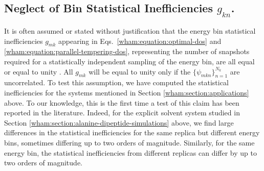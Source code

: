 \subsection{Neglect of Bin Statistical Inefficiencies $g_{kn}$.}
\label{wham:section:neglect-of-bin-statistical-inefficiencies}

It is often assumed or stated without justification that the energy bin statistical inefficiencies $g_{mk}$ appearing in Eqs.\ \ref{wham:equation:optimal-dos} and \ref{wham:equation:parallel-tempering-dos}, representing the number of snapshots required for a statistically independent sampling of the energy bin, are all equal or equal to unity \cite{kumar:1992a,sugita:1999a,okamoto:2004a}.  All $g_{mk}$ will be equal to unity only if the $\{\psi_{mkn}\}_{n = 1}^{N_k}$ are uncorrelated.  To test this assumption, we have computed the statistical inefficiencies for the systems mentioned in Section \ref{wham:section:applications} above.  To our knowledge, this is the first time a test of this claim has been reported in the literature.  Indeed, for the explicit solvent system studied in Section \ref{wham:section:alanine-dipeptide-simulations} above, we find large differences in the statistical inefficiencies for the same replica but different energy bins, sometimes differing up to two orders of magnitude.  Similarly, for the same energy bin, the statistical inefficiencies from different replicas can differ by up to two orders of magnitude.

